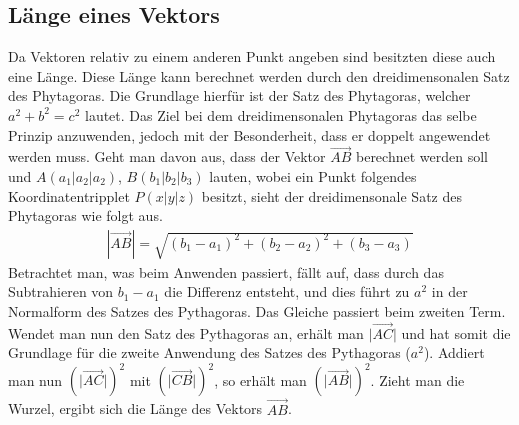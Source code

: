 \subsection{Länge eines Vektors}
Da Vektoren relativ zu einem anderen Punkt angeben sind besitzten diese auch eine Länge. Diese Länge kann berechnet werden durch den dreidimensonalen Satz des Phytagoras. Die Grundlage hierfür ist der Satz des Phytagoras, welcher $a^2+b^2=c^2$ lautet. Das Ziel bei dem dreidimensonalen Phytagoras das selbe Prinzip anzuwenden, jedoch mit der Besonderheit, dass er doppelt angewendet werden muss. Geht man davon aus, dass der Vektor $\vec{AB}$ berechnet werden soll und $A(a_1|a_2|a_2)$, $B(b_1|b_2|b_3)$ lauten, wobei ein Punkt folgendes Koordinatentripplet $P(x|y|z)$ besitzt,  sieht der dreidimensonale Satz des Phytagoras wie folgt aus. 
\begin{align*}
	|\vec{AB}|=\sqrt{(b_1-a_1)^2+(b_2-a_2)^2+(b_3-a_3)}
\end{align*}
Betrachtet man, was beim Anwenden passiert, fällt auf, dass durch das Subtrahieren von $b_1 - a_1$ die Differenz entsteht, und dies führt zu $a^2$ in der Normalform des Satzes des Pythagoras. Das Gleiche passiert beim zweiten Term. Wendet man nun den Satz des Pythagoras an, erhält man $\lvert \vec{AC} \rvert$ und hat somit die Grundlage für die zweite Anwendung des Satzes des Pythagoras ($a^2$). Addiert man nun $(\lvert \vec{AC} \rvert)^2$ mit $(\lvert \vec{CB} \rvert)^2$, so erhält man $(\lvert \vec{AB} \rvert)^2$. Zieht man die Wurzel, ergibt sich die Länge des Vektors $\vec{AB}$.

